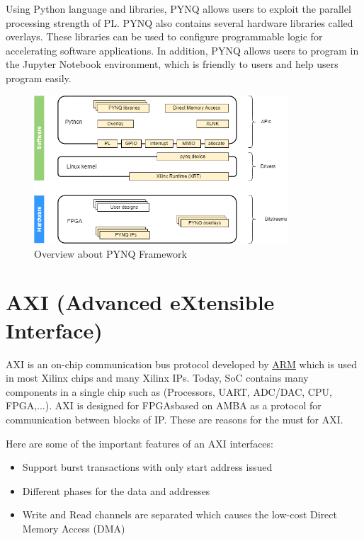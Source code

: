 \documentclass[a4paper, 12pt]{report}
\begin{document}
Using Python language and libraries, PYNQ allows users to exploit the parallel processing strength of PL. PYNQ also contains several hardware libraries called overlays. These libraries can be used to configure programmable logic for accelerating software applications. In addition, PYNQ allows users to program in the Jupyter Notebook environment, which is friendly to users and help users program easily.
\begin{center}
    \begin{figure}[H]
        \begin{center}
            \includegraphics[width=9.5cm]{picture/pynq/pynq.drawio (1).png}
        \end{center}
        \caption{Overview about PYNQ Framework}
        \label{ref Figure}
    \end{figure}
\end{center}


\section{AXI (\textbf{A}dvanced e\textbf{X}tensible \textbf{I}nterface)}
AXI is an on-chip communication bus protocol developed by \href{https://en.wikipedia.org/wiki/Arm_(company)}{ARM} which is used in most Xilinx chips and many Xilinx IPs. Today, SoC contains many components in a single chip such as (Processors, UART, ADC/DAC, CPU, FPGA,...). AXI is designed for FPGAsbased on AMBA as a protocol for communication between blocks of IP. These are reasons for the must for AXI.

Here are some of the important features of an AXI interfaces:
\begin{itemize}
\item Support burst transactions with only start address issued
\item Different phases for the data and addresses
\item Write and Read channels are separated which causes the low-cost Direct Memory Access (DMA)
\end{itemize}
\end{document}
